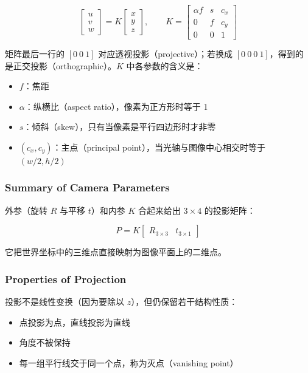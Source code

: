 \[
\begin{bmatrix} u \\ v \\ w \end{bmatrix}
= K \begin{bmatrix} x \\ y \\ z \end{bmatrix}, \qquad
K = \begin{bmatrix}
    \alpha f & s & c_x \\
    0 & f & c_y \\
    0 & 0 & 1
\end{bmatrix}
\]

矩阵最后一行的 $[0\ 0\ 1]$ 对应透视投影（projective）；若换成 $[0\ 0\ 0\ 1]$，得到的是正交投影（orthographic）。$K$ 中各参数的含义是：

\begin{itemize}
    \item $f$：焦距
    \item $\alpha$：纵横比（aspect ratio），像素为正方形时等于 1
    \item $s$：倾斜（skew），只有当像素是平行四边形时才非零
    \item $(c_x, c_y)$：主点（principal point），当光轴与图像中心相交时等于 $(w/2, h/2)$
\end{itemize}

\subsubsection{Summary of Camera Parameters}

外参（旋转 $R$ 与平移 $t$）和内参 $K$ 合起来给出 $3\times4$ 的投影矩阵：

\[
P = K \begin{bmatrix} R_{3\times3} & t_{3\times1} \end{bmatrix}
\]

它把世界坐标中的三维点直接映射为图像平面上的二维点。

\subsubsection{Properties of Projection}

投影不是线性变换（因为要除以 $z$），但仍保留若干结构性质：

\begin{itemize}
    \item 点投影为点，直线投影为直线
    \item 角度不被保持
    \item 每一组平行线交于同一个点，称为灭点（vanishing point）
\end{itemize}

